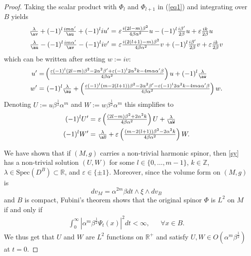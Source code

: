 \documentclass[12pt]{amsart}
\begin{document}
\begin{proof}
Taking the scalar product with $\Phi_l$ and $\Phi_{l+1}$ in
(\ref{eq1}) and integrating over $B$ yields
\begin{align*}
\tfrac{\lambda}\av+(-1)^l\tfrac{im{\alpha}'}\au+(-1)^liu'=&\ 
{\varepsilon}\tfrac{i(2l-m){\beta}^2}{4{\beta}{\alpha} ^2}u
-(-1)^l\tfrac{i{\beta}'}{2{\beta}}u+{\varepsilon}\tfrac{ik}{2{\beta}}u\\
\tfrac{\lambda}\au-(-1)^l\tfrac{im{\alpha}'}\av-(-1)^liv'=&\ 
{\varepsilon}\tfrac{i(2(l+1)-m){\beta}^2}{4{\beta}{\alpha}^2}v
+(-1)^l\tfrac{i{\beta}'}{2{\beta}}v+{\varepsilon}\tfrac{ik}{2{\beta}}v
\end{align*}
which can be written after setting $w:=iv$:
\begin{align*}
u'=&\left(\tfrac{{\varepsilon}(-1)^l(2l-m){\beta}^2-2{\alpha} ^2{\beta}'+
{\varepsilon}(-1)^l2{\alpha} ^2 k-4m{\alpha}{\alpha}'{\beta}}{4{\beta}{\alpha}
  ^2}\right)u+(-1)^l\tfrac{\lambda}\aw\\ 
w'=&\ (-1)^l\tfrac{\lambda}\au+
\left(\tfrac{{\varepsilon}(-1)^l(m-2(l+1)){\beta}^2-2{\alpha} ^2{\beta}'-{\varepsilon} 
(-1)^l2{\alpha} ^2 k-4m{\alpha}{\alpha}'{\beta}}{4{\beta}{\alpha}
  ^2}\right)w.
\end{align*}
Denoting $U:=u {\beta}^{\frac12}{\alpha} ^m$ and $W:=w {\beta}^{\frac12}{\alpha} ^m$ this
simplifies to
\begin{equation}\label{sy}\begin{split}
(-1)^lU'=&\ {\varepsilon} \left(\tfrac{(2l-m){\beta}^2+2{\alpha} ^2 k}{4{\beta}{\alpha}
  ^2}\right)U+\tfrac{\lambda}\aW\\
(-1)^lW'=&\ \tfrac{\lambda}\aU+
{\varepsilon} \left(\tfrac{(m-2(l+1)){\beta}^2-2{\alpha} ^2 k}{4{\beta}{\alpha}^2}\right)W.
\end{split}
\end{equation}

We have shown that if $(M,g)$ carries a non-trivial harmonic spinor, 
then \eqref{sy} has a non-trivial solution $(U,W)$ for some
$l\in\{0,\ldots,m-1\}$, $k\in{{\mathbb Z}}$, $\lambda\in \mathrm{Spec}(D^B)\subset{{\mathbb R}}$, 
and ${\varepsilon}\in\{\pm 1\}$. Moreover, since the volume form on $(M,g)$ is
$$dv_M={\alpha}^{2m}{\beta} dt\wedge\xi\wedge dv_B$$
and $B$ is compact, Fubini's theorem shows that the original spinor
$\Phi$ is $L^2$ on $M$ if and only if  
\begin{align*}
\int_0^\infty |{\alpha}^m{\beta}^{\frac12}{\Psi}_t(x)|^2dt<\infty,&&\forall x\in B.
\end{align*}
We thus get that
$U$ and $W$ are $L^2$ functions on ${{\mathbb R}}^+$ and satisfy
$U,W\in O({\alpha}^m{\beta}^{\frac{1}{2}})$ at $t=0$.


\end{proof}
\end{document}
